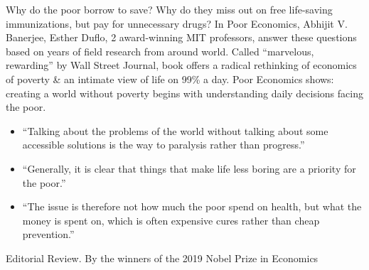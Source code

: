 \documentclass{article}
\begin{document}
\begin{enumerate}
	Why do the poor borrow to save? Why do they miss out on free life-saving immunizations, but pay for unnecessary drugs? In Poor Economics, {\sc Abhijit V. Banerjee, Esther Duflo}, 2 award-winning MIT professors, answer these questions based on years of field research from around world. Called ``marvelous, rewarding'' by Wall Street Journal, book offers a radical rethinking of economics of poverty \& an intimate view of life on 99\% a day. Poor Economics shows: creating a world without poverty begins with understanding daily decisions facing the poor.
	\begin{itemize}
		\item ``Talking about the problems of the world without talking about some accessible solutions is the way to paralysis rather than progress.''
		\item ``Generally, it is clear that things that make life less boring are a priority for the poor.''
		\item ``The issue is therefore not how much the poor spend on health, but what the money is spent on, which is often expensive cures rather than cheap prevention.''
	\end{itemize}
	{\sf Editorial Review.} By the winners of the 2019 Nobel Prize in Economics


\end{enumerate}
\end{document}

